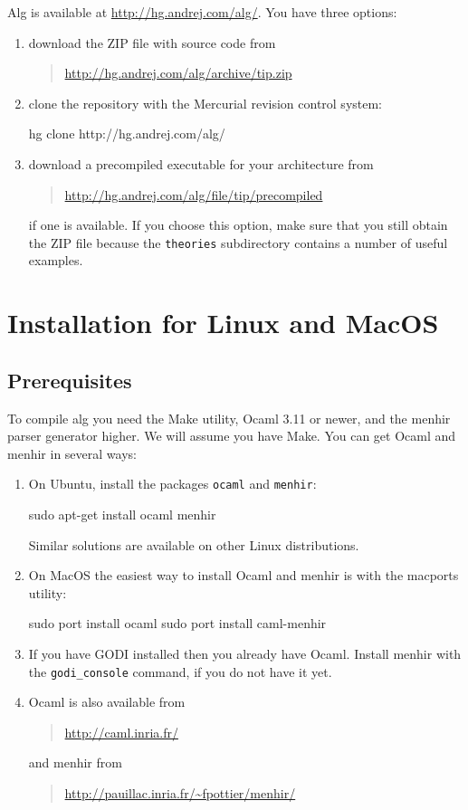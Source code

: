 \documentclass{report}
\begin{document}
Alg is available at \url{http://hg.andrej.com/alg/}. You have three
options:
%
\begin{enumerate}
\item download the ZIP file with source code from
  \begin{quote}
    \url{http://hg.andrej.com/alg/archive/tip.zip}
  \end{quote}
\item clone the repository with the Mercurial revision control system:
%
\begin{shell}
hg clone http://hg.andrej.com/alg/
\end{shell}
\item download a precompiled executable for your architecture from
  \begin{quote}
    \url{http://hg.andrej.com/alg/file/tip/precompiled}
  \end{quote}
  if one is available. If you choose this option, make sure that you
  still obtain the ZIP file because the \texttt{theories} subdirectory
  contains a number of useful examples.
\end{enumerate}

\section{Installation for Linux and MacOS}
\label{sec:comp-under-linux}

\subsection{Prerequisites}

To compile alg you need the Make utility, Ocaml 3.11 or newer, and the
menhir parser generator higher. We will assume you have Make. You can
get Ocaml and menhir in several ways:
%
\begin{enumerate}
\item On Ubuntu, install the packages \texttt{ocaml} and
  \texttt{menhir}:
\begin{shell}
sudo apt-get install ocaml menhir    
\end{shell}
  Similar solutions are available on other Linux distributions.
\item On MacOS the easiest way to install Ocaml and menhir is with
  the macports utility:
\begin{shell}
sudo port install ocaml
sudo port install caml-menhir
\end{shell}
\item If you have GODI installed then you already have Ocaml. Install
  menhir with the \texttt{godi\_console} command, if you do not have it yet.
\item Ocaml is also available from
  \begin{quote}
    \url{http://caml.inria.fr/}
  \end{quote}
  and menhir from
  \begin{quote}
    \url{http://pauillac.inria.fr/~fpottier/menhir/}
  \end{quote}
\end{enumerate}
\end{document}
